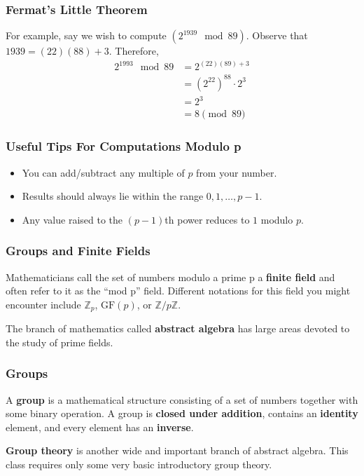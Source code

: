 \documentclass{beamer}
\newcommand{\<}{\langle}
\renewcommand{\>}{\rangle}
\begin{document}
\begin{frame}
\frametitle{Fermat's Little Theorem}

For example, say we wish to compute $(2^{1939} \mod{89})$. Observe that $1939 = (22)(88) + 3$. Therefore, 
\begin{align*}
2^{1993} \mod{89} &= 2^{(22)(89) + 3} \\
	&= (2^{22})^{88}\cdot 2^{3} \\
	&= 2^{3} \\
	&= 8\pmod{89}
\end{align*}
\end{frame}



\begin{frame}
\frametitle{Useful Tips For Computations Modulo p}

\begin{itemize}
\item You can add/subtract any multiple of $p$ from your number.
\item Results should always lie within the range $0, 1, \dots, p-1$.
\item Any value raised to the $(p-1)$th power reduces to $1$ modulo $p$.
\end{itemize}
\end{frame}


\begin{frame}
\frametitle{Groups and Finite Fields}

Mathematicians call the set of numbers modulo a prime p a \textbf{finite field} and
often refer to it as the ``mod p'' field. Different notations for this field you might encounter include $\mathbb{Z}_p$, $\mathrm{GF}(p)$, or $\mathbb{Z}/p\mathbb{Z}$.\newline 

The branch of mathematics called \textbf{abstract algebra} has large areas devoted to the study of prime fields.
\end{frame}


\begin{frame}
\frametitle{Groups}

A \textbf{group} is a mathematical structure consisting of a set of numbers together with some binary operation. A group is \textbf{closed under addition}, contains an \textbf{identity} element, and every element has an \textbf{inverse}. \newline

\textbf{Group theory} is another wide and important branch of abstract algebra. This class requires only some very basic introductory group theory.
\end{frame}
\end{document}
